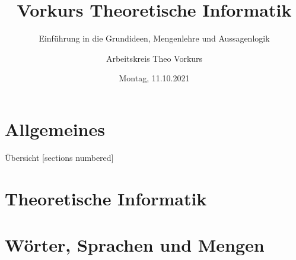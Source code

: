 %
%
%
%



\title{Vorkurs Theoretische Informatik}
\subtitle{Einführung in die Grundideen, Mengenlehre und Aussagenlogik}
\date{Montag, 11.10.2021}
\author{Arbeitskreis Theo Vorkurs}



\maketitle

\section{Allgemeines}



\begin{frame}[fragile]{Übersicht}
	[sections numbered]
	\tableofcontents%
\end{frame}

\section{Theoretische Informatik}



\section{Wörter, Sprachen und Mengen}




